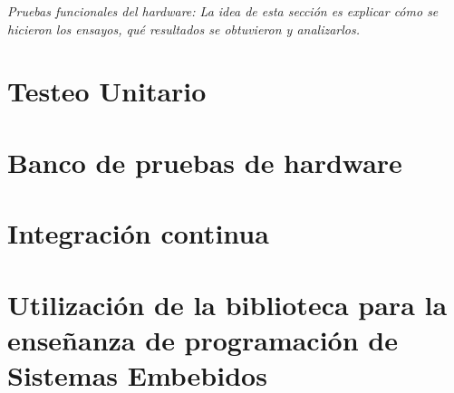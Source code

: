 \emph{Pruebas funcionales del hardware: La idea de esta sección es explicar cómo se hicieron los ensayos, qué resultados se obtuvieron y analizarlos.}




\section{Testeo Unitario}
\label{sec:unitTest}


\section{Banco de pruebas de hardware}
\label{sec:testBench}


\section{Integración continua}
\label{sec:ci}


\section{Utilización de la biblioteca para la enseñanza de programación de Sistemas Embebidos}
\label{sec:teach}


